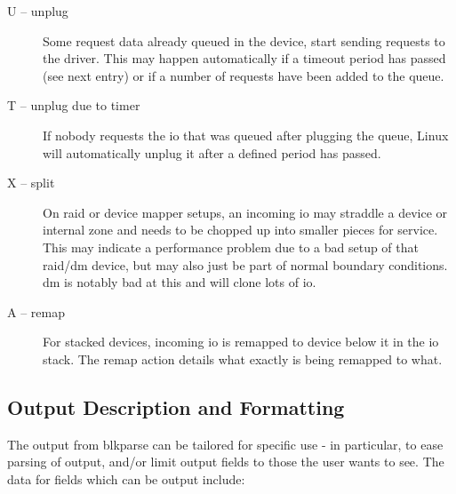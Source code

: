 \documentclass{article}
\begin{document}
\begin{description}
  \item[U -- unplug] Some request data already queued in the device,
  start sending requests to the driver. This may happen automatically
  if a timeout period has passed (see next entry) or if a number of
  requests have been added to the queue.

  \item[T -- unplug due to timer] If nobody requests the io that was queued
  after plugging the queue, Linux will automatically unplug it after a
  defined period has passed.

  \item[X -- split] On raid or device mapper setups, an incoming io may
  straddle a device or internal zone and needs to be chopped up into
  smaller pieces for service. This may indicate a performance problem due
  to a bad setup of that raid/dm device, but may also just be part of
  normal boundary conditions. dm is notably bad at this and will clone
  lots of io.

  \item[A -- remap] For stacked devices, incoming io is remapped to device
  below it in the io stack. The remap action details what exactly is
  being remapped to what.

\end{description}

\subsection{\label{sec:blkparse-format}Output Description and Formatting}

The output from blkparse can be tailored for specific use - in particular,
to ease parsing of output, and/or limit output fields to those the user
wants to see. The data for fields which can be output include:
\end{document}
